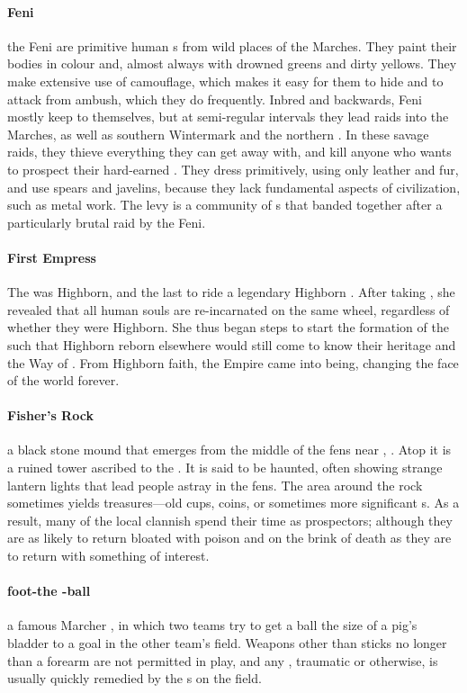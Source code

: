 \paragraph{Feni} the Feni are primitive human s from wild places of the Marches. They paint their bodies in colour and, almost always with drowned greens and dirty yellows. They make extensive use of camouflage, which makes it easy for them to hide and to attack from ambush, which they do frequently. Inbred and backwards, Feni mostly keep to themselves, but at semi-regular intervals they lead raids into the Marches, as well as southern Wintermark and the northern . In these savage raids, they thieve everything they can get away with, and kill anyone who wants to prospect their hard-earned . They dress primitively, using only leather and fur, and use spears and javelins, because they lack fundamental aspects of civilization, such as metal work. The  levy is a community of s that banded together after a particularly brutal raid by the Feni.
\paragraph{First Empress} The  was Highborn, and the last to ride a legendary Highborn . After taking , she revealed that all human souls are re-incarnated on the same wheel, regardless of whether they were Highborn. She thus began steps to start the formation of the  such that Highborn reborn elsewhere would still come to know their heritage and the Way of . From Highborn faith, the Empire came into being, changing the face of the world forever.
\paragraph{Fisher’s Rock} a black stone mound that emerges from the middle of the fens near , . Atop it is a ruined tower ascribed to the . It is said to be haunted, often showing strange lantern lights that lead people astray in the fens. The area around the rock sometimes yields treasures—old cups, coins, or sometimes more significant s. As a result, many of the local clannish  spend their time as prospectors; although they are as likely to return bloated with poison and on the brink of death as they are to return with something of interest. 
\paragraph{foot-the -ball} a famous Marcher , in which two teams try to get a ball the size of a pig's bladder to a goal in the other team's field. Weapons other than sticks no longer than a forearm are not permitted in play, and any , traumatic or otherwise, is usually quickly remedied by the s on the field.
